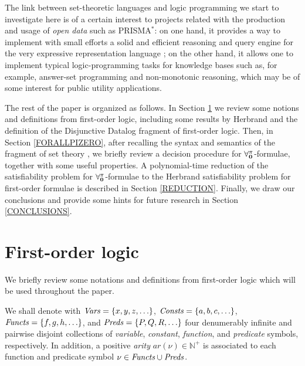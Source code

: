 \documentclass[a4paper]{llncs}
\newcommand{\ar}{\mathit{ar}}
\newcommand{\nat}{\mathbb{N}}
\begin{document}
The link between set-theoretic languages and logic programming
we start to investigate here is of a certain interest to projects related
with the production and usage of \emph{open data} such as PRISMA$^{*}$:
on one hand, it provides a way to implement with small efforts a solid
and efficient reasoning and query engine for
the very expressive representation language \dlForallpizero; on the
other hand, it allows one to implement typical logic-programming tasks
for \dlForallpizero knowledge bases such as, for example,
answer-set programming and non-monotonic reasoning,
which may be of some interest for public utility applications.

The rest of the paper is organized as follows.  In Section
\ref{PRELIMINARIES} we review some notions and definitions from
first-order logic, including some results by
Herbrand and the definition of the Disjunctive Datalog
fragment of first-order logic.  Then, in Section \ref{FORALLPIZERO},
after recalling the syntax and semantics of the fragment of set theory
\Forallpizero, we briefly review a decision procedure for
$\mathbf{\forall_{0}^{\pi}}$-formulae, together with some useful properties.  A 
polynomial-time reduction of the satisfiability problem for
$\mathbf{\forall_{0}^{\pi}}$-formulae to the Herbrand satisfiability problem for
first-order formulae is described in Section \ref{REDUCTION}.
Finally, we draw our conclusions and provide some hints for future
research in Section \ref{CONCLUSIONS}.



\section{First-order logic}\label{PRELIMINARIES}


We briefly review some notations and definitions
from first-order logic which will be used throughout the
paper.

We shall denote with
$\mathit{Vars}=\{x, y, z, \ldots \}$, $\mathit{Consts}=\{a, b, c, \ldots \}$,
$\mathit{Functs}=\{f, g, h, \ldots \}$, and $\mathit{Preds}=\{P, Q, R, \ldots\}$
four denumerably infinite and pairwise disjoint collections
of \emph{variable}, \emph{constant}, \emph{function}, and \emph{predicate}
symbols, respectively.
In addition, a positive \emph{arity} $\ar(\nu) \in \nat^+$ is 
associated to each
function and predicate symbol $\nu \in \mathit{Functs} \cup \mathit{Preds}$.
%
%
\end{document}

